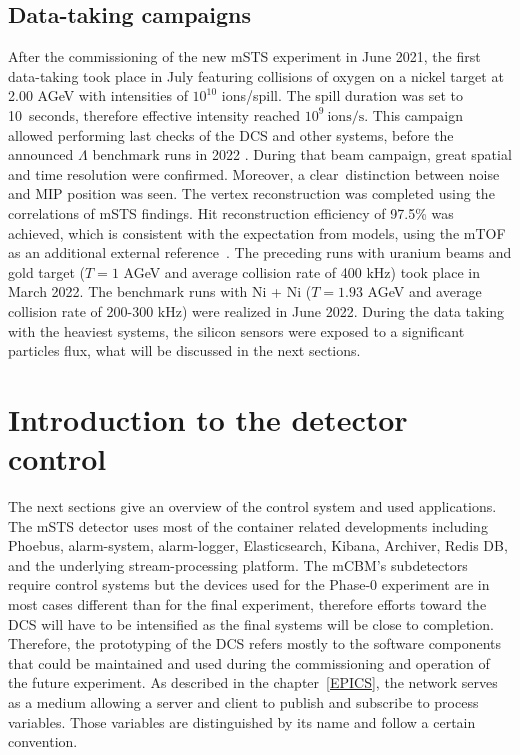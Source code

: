 \subsection{Data-taking campaigns}
After the commissioning of the new \gls{mSTS} experiment in June 2021, the first data-taking took place in July featuring collisions of oxygen on a nickel target at 2.00 AGeV with intensities of $10^{10}$ ions/spill. The spill duration was set to \SI{10}{seconds}, therefore effective intensity reached $10^{9}~\mathrm{ions/s}$. This campaign allowed performing last checks of the DCS and other systems, before the announced $\Lambda$ benchmark runs in 2022 \cite{sturm3}. During that beam campaign, great spatial and time resolution were confirmed. Moreover, a clear distinction between noise and MIP position was seen. The vertex reconstruction was completed using the correlations of \gls{mSTS} findings. Hit reconstruction efficiency of 97.5\% was achieved, which is consistent with the expectation from models, using the mTOF as an additional external reference~\cite{dario1}. The preceding runs with uranium beams and gold target ($T = 1$ AGeV and average collision rate of 400 kHz) took place in March 2022. The benchmark runs with Ni + Ni ($T = 1.93$ AGeV and average collision rate of 200-300 kHz) were realized in June 2022. During the data taking with the heaviest systems, the silicon sensors were exposed to a significant particles flux, what will be discussed in the next sections. 
\section{Introduction to the detector control}
The next sections give an overview of the control system and used applications. The \gls{mSTS} detector uses most of the container related developments including Phoebus, alarm-system, alarm-logger, Elasticsearch, Kibana, Archiver, Redis \gls{DB}, and the underlying stream-processing platform. The mCBM's subdetectors require control systems but the devices used for the Phase-0 experiment are in most cases different than for the final experiment, therefore efforts toward the DCS will have to be intensified as the final systems will be close to completion. Therefore, the prototyping of the DCS refers mostly to the software components that could be maintained and used during the commissioning and operation of the future experiment. As described in the chapter~\ref{EPICS}, the network serves as a medium allowing a server and client to publish and subscribe to process variables. Those variables are distinguished by its name and follow a certain convention.

